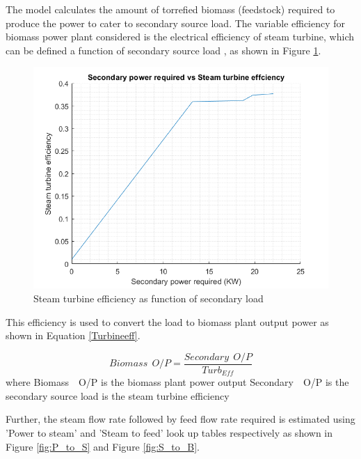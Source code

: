\noindent The model calculates the amount of torrefied biomass (feedstock)  required to produce the power to cater to secondary source load. The variable efficiency for biomass power plant considered is the electrical efficiency of steam turbine, which can be defined a function of secondary source load \citep{karakurt}, as shown in Figure \ref{fig:SteamEff}. 

\begin{figure}[H]
    \centering
    \includegraphics[width = 0.5 \linewidth]{Final_report/Images/steam_tur_eff.png}
    \caption{Steam turbine efficiency as function of secondary load}
    \label{fig:SteamEff}
\end{figure}



This efficiency is used to convert the load to biomass plant output power as shown in Equation \ref{Turbineeff}. 

\begin{equation}\label{Turbineeff}
   Biomass\ \ O/P = \frac{Secondary\ \ O/P}{Turb_{Eff}}
\end{equation}
\newline
where 
\newline Biomass\ \ O/P is the biomass plant power output
\newline Secondary\ \ O/P is the secondary source load
 is the steam turbine efficiency
\newline

\noindent Further, the steam flow rate followed by feed flow rate required is estimated using 'Power to steam'  and 'Steam to feed' look up tables respectively as shown in Figure \ref{fig:P_to_S} and Figure \ref{fig:S_to_B}.


